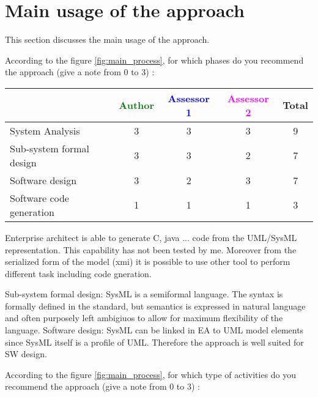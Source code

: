\section{Main usage of the approach}
\label{main_usage}
This section discusses the main usage of the approach.

According to the figure \ref{fig:main_process}, for which phases do you recommend the approach (give a note from 0 to  3) :

\begin{tabular}{|l | c | c | c | c|}
\hline
& \textcolor{green}{Author} & \textcolor{blue}{Assessor 1} & \textcolor{magenta}{Assessor 2} & Total \\
\hline 
System Analysis & 3  & 3 & 3 & 9 \\
\hline
Sub-system formal design & 3 & 3 & 2 & 7 \\
\hline
Software design & 3 & 2 & 3 & 7 \\
\hline
Software code generation & 1 & 1 & 1 & 3 \\
\hline
\end{tabular}
\begin{author_comment}
Enterprise architect is able to generate C, java ... code from the UML/SysML
representation. This capability has not been tested by me. Moreover
from the serialized form of the model (xmi) it is possible to use
other tool to perform different task including code gneration.
\end{author_comment}
\begin{assessor2}
Sub-system formal design: SysML is a semiformal language. The syntax is formally defined in the standard, but semantics is expressed in natural language and often purposely left ambigiuos to allow for maximum flexibility of the language.
Software design: SysML can be linked in EA to UML model elements since SysML itself is a profile of UML. Therefore the approach is well suited for SW design.
\end{assessor2}

According to the figure \ref{fig:main_process}, for which type of activities do you recommend the approach (give a note from 0 to  3) :

